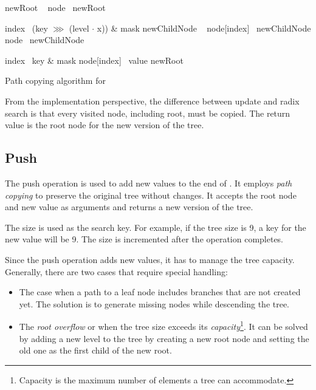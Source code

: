 \begin{listing}[ht!]
    \begin{algorithmic}[1]
            \State newRoot \la\ 
            \State node \la\ newRoot

                \State index \la\ (key $\ggg$ (level $\cdot$ x)) \& mask
                \State newChildNode \la\ 
                \State node[index] \la\ newChildNode
                \State node \la\ newChildNode
            \EndFor

            \State index \la\ key \& mask
            \State node[index] \la\ value
            \State \Return newRoot
        \EndFunction
    \end{algorithmic}

    \caption{Path copying algorithm for \treerb{}}
    \label{lst:rb-tree-update}
\end{listing}

From the implementation perspective, the difference between update and radix search is that every visited node, including root, must be copied. The return value is the root node for the new version of the tree.

\subsection{Push}
The push operation is used to add new values to the end of \treerb{}. It employs \emph{path copying} to preserve the original tree without changes. It accepts the root node and new value as arguments and returns a new version of the tree.

The \treerb{} size is used as the search key. For example, if the tree size is 9, a key for the new value will be 9. The size is incremented after the operation completes.

Since the push operation adds new values, it has to manage the tree capacity. Generally, there are two cases that require special handling:

\begin{itemize}
    \item The case when a path to a leaf node includes branches that are not created yet. The solution is to generate missing nodes while descending the tree.
    \item The \emph{root overflow} or when the tree size exceeds its \emph{capacity}\footnote{Capacity is the maximum number of elements a tree can accommodate.}. It can be solved by adding a new level to the tree by creating a new root node and setting the old one as the first child of the new root.
\end{itemize}

